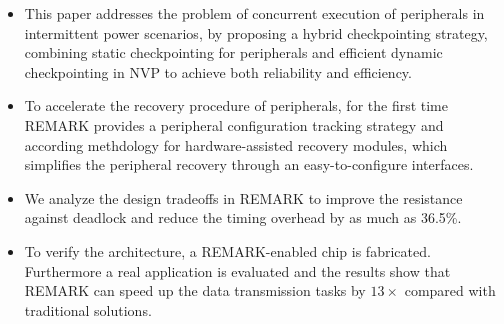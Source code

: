 %
\begin{itemize}
    \item This paper addresses the problem of concurrent execution of peripherals in intermittent power scenarios, by proposing a hybrid checkpointing strategy, combining static checkpointing for peripherals and efficient dynamic checkpointing in NVP to achieve both reliability and efficiency.

    \item To accelerate the recovery procedure of peripherals, for the first time REMARK provides a peripheral configuration tracking strategy and according methdology for hardware-assisted recovery modules, which simplifies the peripheral recovery through an easy-to-configure interfaces. 

	\item We analyze the design tradeoffs in REMARK to improve the resistance against deadlock and reduce the timing overhead by as much as 36.5\%.

    \item To verify the architecture, a REMARK-enabled chip is fabricated. Furthermore a real application is evaluated and the results show that REMARK can speed up the data transmission tasks by $13\times$ compared with traditional solutions. 

\end{itemize}


%
%
